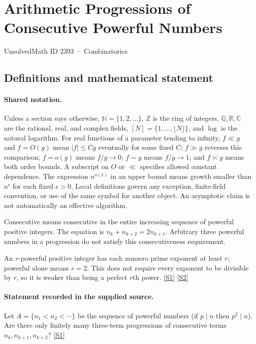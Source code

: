 \documentclass[11pt,a4paper]{article}
\newcommand{\N}{\mathbb{N}}
\newcommand{\Z}{\mathbb{Z}}
\newcommand{\Q}{\mathbb{Q}}
\newcommand{\R}{\mathbb{R}}
\newcommand{\C}{\mathbb{C}}
\newcommand{\sref}[2]{\hyperlink{source:#1:#2}{[S#2]}}
\begin{document}

\setcounter{section}{2392}

\section{Arithmetic Progressions of Consecutive Powerful Numbers}\label{2393}

{\small\sffamily UnsolvedMath ID 2393 · Combinatorics}

\subsection{Definitions and mathematical statement}

\paragraph{Shared notation.}Unless a section says otherwise, $\N=\{1,2,\ldots\}$,
$\Z$ is the ring of integers, $\Q,\R,\C$ are the rational, real, and complex
fields, $[N]=\{1,\ldots,\lfloor N\rfloor\}$, and $\log$ is the natural
logarithm. For real functions of a parameter tending to infinity,
$f\ll g$ and $f=O(g)$ mean $|f|\leq Cg$ eventually for some fixed $C$;
$f\gg g$ reverses this comparison; $f=o(g)$ means $f/g\to0$;
$f\sim g$ means $f/g\to1$; and $f\asymp g$ means both order bounds.
A subscript on $O$ or $\ll$ specifies allowed constant dependence.
The expression $n^{o(1)}$ in an upper bound means growth smaller than
$n^\epsilon$ for each fixed $\epsilon>0$. Local definitions govern any
exception, finite-field convention, or use of the same symbol for another
object. An asymptotic claim is not automatically an effective algorithm.



Consecutive means consecutive in the entire increasing sequence of powerful positive integers. The equation is $n_k+n_{k+2}=2n_{k+1}$. Arbitrary three powerful numbers in a progression do not satisfy this consecutiveness requirement.

An $r$-powerful positive integer has each nonzero prime exponent at least $r$; powerful alone means $r=2$. This does not require every exponent to be divisible by $r$, so it is weaker than being a perfect $r$th power. \sref{2393}{1} \sref{2393}{2}

\paragraph{Statement recorded in the supplied source.}
Let $A=\{n_1<n_2<\cdots\}$ be the sequence of powerful numbers (if $p\mid n$ then $p^2\mid n$).
Are there only finitely many three-term progressions of consecutive terms $n_k,n_{k+1},n_{k+2}$? \sref{2393}{1}
\end{document}
